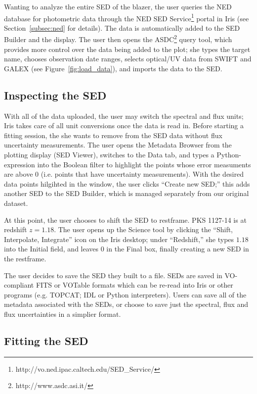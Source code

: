 \documentclass[5p]{elsarticle}
\begin{document}
Wanting to analyze the entire SED of the blazer, the user queries the NED database for photometric data through the NED SED Service\footnote{http://vo.ned.ipac.caltech.edu/SED\_Service/} portal in Iris (see Section~\ref{subsec:ned} for details). The data is automatically added to the SED Builder and the display. The user then opens the ASDC\footnote{http://www.asdc.asi.it/} query tool, which provides more control over the data being added to the plot; she types the target name, chooses observation date ranges, selects optical/UV data from SWIFT and GALEX (see Figure~\ref{fig:load_data}), and imports the data to the SED.


\subsection{Inspecting the SED}
\label{subsec:inspect-sed}

With all of the data uploaded, the user may switch the spectral and flux units; Iris takes care of all unit conversions once the data is read in. Before starting a fitting session, the she wants to remove from the SED data without flux uncertainty measurements. The user opens the Metadata Browser from the plotting display (SED Viewer), switches to the Data tab, and types a Python-expression into the Boolean filter to highlight the points whose error measuments are above 0 (i.e. points that have uncertainty measurements). With the desired data points hilgihted in the window, the user clicks ``Create new SED;'' this adds another SED to the SED Builder, which is managed separately from our original dataset.

At this point, the user chooses to shift the SED to restframe. PKS 1127-14 is at redshift $z=1.18$. The user opens up the Science tool by clicking the ``Shift, Interpolate, Integrate'' icon on the Iris desktop; under ``Redshift,'' she types $1.18$ into the Initial field, and leaves 0 in the Final box, finally creating a new SED in the restframe.

The user decides to save the SED they built to a file. SEDs are saved in VO-compliant FITS or VOTable formats which can be re-read into Iris or other programs (e.g. TOPCAT; IDL or Python interpreters). Users can save all of the metadata associated with the SEDs, or choose to save just the spectral, flux and flux uncertainties in a simplier format.

\subsection{Fitting the SED}
\end{document}
